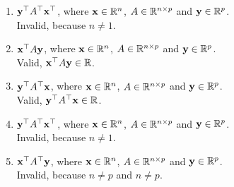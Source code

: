 \documentclass[twocolumn]{article}
\begin{document}
\begin{enumerate}
  \item $\mathbf{y}^\top A^\top \mathbf{x}^\top$, where $\mathbf{x} \in \mathbb{R}^{n}$, $A \in \mathbb{R}^{n \times p}$ and $\mathbf{y} \in \mathbb{R}^{p}$.
    \\
    Invalid, because $n \ne 1$.
  \item $\mathbf{x}^\top A     \mathbf{y}    $, where $\mathbf{x} \in \mathbb{R}^{n}$, $A \in \mathbb{R}^{n \times p}$ and $\mathbf{y} \in \mathbb{R}^{p}$.
    \\
    Valid, $\mathbf{x}^\top A     \mathbf{y} \in \mathbb{R}$.
  \item $\mathbf{y}^\top A^\top \mathbf{x}$, where $\mathbf{x} \in \mathbb{R}^{n}$, $A \in \mathbb{R}^{n \times p}$ and $\mathbf{y} \in \mathbb{R}^{p}$.
    \\
    Valid, $\mathbf{y}^\top A^\top     \mathbf{x} \in \mathbb{R}$.
  \item $\mathbf{y}^\top A^\top \mathbf{x}^\top$, where $\mathbf{x} \in \mathbb{R}^{n}$, $A \in \mathbb{R}^{n \times p}$ and $\mathbf{y} \in \mathbb{R}^{p}$.
    \\
    Invalid, because $n \ne 1$.
  \item $\mathbf{x}^\top A^\top \mathbf{y}$, where $\mathbf{x} \in \mathbb{R}^{n}$, $A \in \mathbb{R}^{n \times p}$ and $\mathbf{y} \in \mathbb{R}^{p}$.
    \\
    Invalid, because $n \ne p$ and $n \ne p$.

  \end{enumerate}
\end{document}
